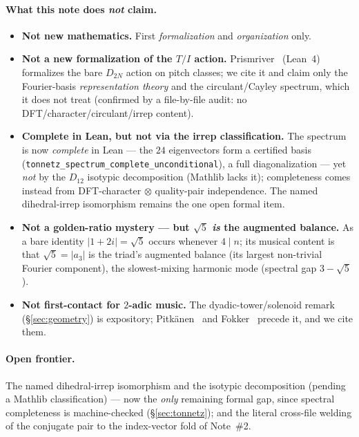 \documentclass[11pt]{article}
\newcommand{\lean}[1]{\texttt{#1}}
\begin{document}
\paragraph{What this note does \emph{not} claim.}
\begin{itemize}\itemsep2pt
  \item \textbf{Not new mathematics.} First \emph{formalization} and \emph{organization} only.
  \item \textbf{Not a new formalization of the $T/I$ action.} Prismriver~\cite{Prismriver} (Lean~4)
        formalizes the bare $D_{2N}$ action on pitch classes; we cite it and claim only the Fourier-basis
        \emph{representation theory} and the circulant/Cayley spectrum, which it does not treat (confirmed by
        a file-by-file audit: no DFT/character/circulant/irrep content).
  \item \textbf{Complete in Lean, but not via the irrep classification.} The spectrum is now \emph{complete}
        in Lean --- the $24$ eigenvectors form a certified basis
        (\lean{tonnetz\_spectrum\_\allowbreak complete\_\allowbreak unconditional}),
        a full diagonalization --- yet \emph{not} by the $D_{12}$ isotypic decomposition (Mathlib lacks it);
        completeness comes instead from DFT-character $\otimes$ quality-pair independence. The named
        dihedral-irrep isomorphism remains the one open formal item.
  \item \textbf{Not a golden-ratio mystery --- but $\sqrt5$ \emph{is} the augmented balance.} As a bare
        identity $|1+2i|=\sqrt5$ occurs whenever $4\mid n$; its musical content is that $\sqrt5=|a_3|$ is the
        triad's augmented balance (its largest non-trivial Fourier component), the slowest-mixing harmonic
        mode (spectral gap $3-\sqrt5$).
  \item \textbf{Not first-contact for $2$-adic music.} The dyadic-tower/solenoid remark (\S\ref{sec:geometry})
        is expository; Pitk\"anen~\cite{Pitkanen} and Fokker~\cite{Fokker} precede it, and we cite them.
\end{itemize}

\paragraph{Open frontier.} The named dihedral-irrep isomorphism and the isotypic decomposition (pending a
Mathlib classification) --- now the \emph{only} remaining formal gap, since spectral completeness is
machine-checked (\S\ref{sec:tonnetz}); and the literal cross-file welding of the conjugate pair to the
index-vector fold of Note~\#2.
\end{document}

